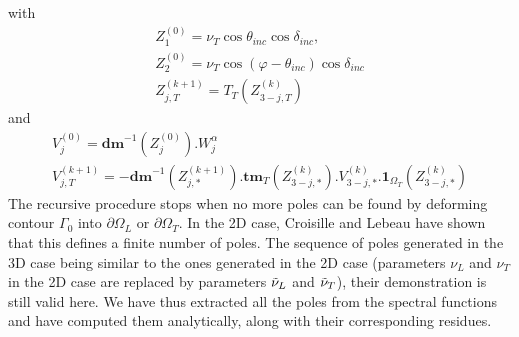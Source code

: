 with
\begin{equation}
\begin{matrix}
Z_{1}^{(0)}=\nu_T \cos \theta_{inc}\cos\delta_{inc},\\ 
Z_{2}^{(0)}=\nu_T \cos(\varphi-\theta_{inc})\cos\delta_{inc}\\
Z_{j,T}^{(k+1)}= T_T(Z_{3-j,T}^{(k)}) 
\end{matrix}
\label{C4:polescr}
\end{equation}
and
\begin{equation}
\begin{matrix}
V_{j}^{(0)}=\textbf{dm}^{-1}(Z_{j}^{(0)}).W_j^{\alpha}\\
V_{j,T}^{(k+1)}=-\textbf{dm}^{-1}(Z_{j,*}^{(k+1)}).\textbf{tm}_T(Z_{3-j,*}^{(k)}).V_{3-j,*}^{(k)}.\textbf{1}_{\Omega_T}(Z_{3-j,*}^{(k)}) 
\end{matrix}
\label{C4:residuscr}
\end{equation}
The recursive procedure stops when no more poles can be found by deforming contour $\Gamma_0$ into $\partial \Omega_L$ or $\partial \Omega_T$. In the 2D case, Croisille and Lebeau \cite{CroisilleLebeau} have shown that this defines a finite number of poles. The sequence of poles generated in the 3D case being similar to the ones generated in the 2D case (parameters $\nu_L$ and $\nu_T$ in the 2D case are replaced by parameters $\tilde{\nu}_L$ and $\tilde{\nu}_T$), their demonstration is still valid here. We have thus extracted all the poles from the spectral functions and have computed them analytically, along with their corresponding residues.

